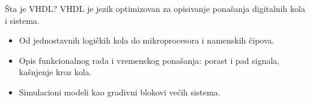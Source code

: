 \begin{frame}[label=07-s013]{Šta je VHDL?}
VHDL je jezik optimizovan za opisivanje ponašanja digitalnih kola i sistema.
\par\vspace{5mm}
\begin{itemize}
\item Od jednostavnih logičkih kola do mikroprocesora i namenskih čipova.
\item Opis funkcionalnog rada i vremenskog ponašanja: porast i pad signala, kašnjenje kroz kola.
\item Simulacioni modeli kao gradivni blokovi većih sistema.
\end{itemize}
\end{frame}
